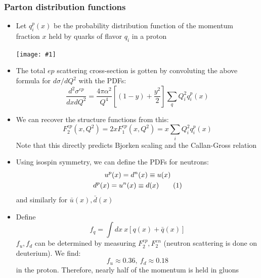 \documentclass[11pt]{article}
\newcommand\numberthis{\addtocounter{equation}{1}\tag{\theequation}}
\newcommand{\ubar}{\bar{u}}
\newcommand{\qbar}{{\bar{q}}}
\newcommand{\dbar}{\bar{d}}
\newcommand{\dd}[2]{\dfrac{d #1}{d #2}}
\newcommand{\embedimgw}[2]{\begin{center}\texttt{[image: \#1]}\end{center}}
\begin{document}
\subsubsection{Parton distribution functions}
\begin{itemize}
  \item Let $q_i^p(x)$ be the probability distribution function of the momentum fraction $x$ held by quarks of flavor $q_i$ in a proton
  \embedimgw{figs/pdfs.png}{.7}
  \item The total $ep$ scattering cross-section is gotten by convoluting the above formula for $d\sigma/dQ^2$ with the PDFs:
  \begin{equation}
    \dd{^2\sigma^{ep}}{xdQ^2} = \frac{4\pi \alpha^2}{Q^4} \left[(1-y)+\frac{y^2}{2}\right] \sum_q Q_i^2 q_i^p(x)
  \end{equation}
  \item We can recover the structure functions from this:
  \begin{equation}
    F_2^{ep}(x,Q^2) = 2xF_1^{ep}(x,Q^2) = x\sum_i Q_i^2 q_i^p(x)
  \end{equation}
  Note that this directly predicts Bjorken scaling and the Callan-Gross relation
  \item Using isospin symmetry, we can define the PDFs for neutrons:
  \begin{gather*}
    u^p(x) = d^n(x) \equiv u(x)\\
    d^p(x) = u^n(x) \equiv d(x)\numberthis
  \end{gather*}
  and similarly for $\ubar(x),\dbar(x)$
  \item Define
  \begin{equation}
    f_q = \int dx~x[q(x)+\qbar(x)]
  \end{equation}
  $f_u,f_d$ can be determined by measuring $F_2^{ep},F_2^{en}$ (neutron scattering is done on deuterium). We find:
  \begin{equation}
    f_u \approx 0.36,~f_d \approx 0.18
  \end{equation}
  in the proton. Therefore, nearly half of the momentum is held in gluons
\end{itemize}
\end{document}
